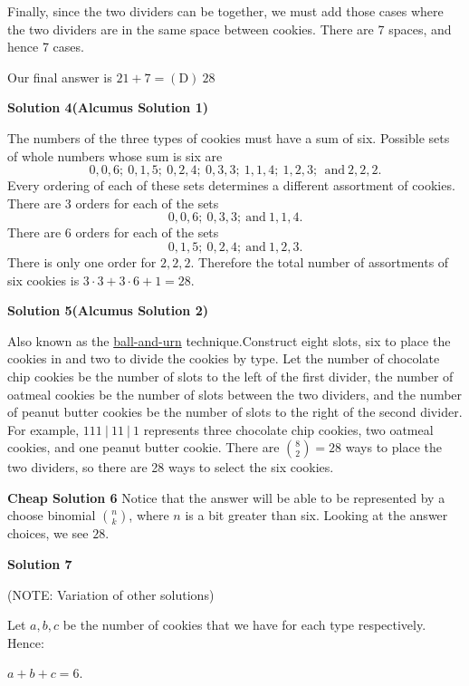 \begin{enumerate}
 Finally, since the two dividers can be together, we must add those cases where the two dividers are in the same space between cookies. There are 7 spaces, and hence 7 cases.

 Our final answer is $21+7=\boxed{\mathrm{(D)}\ 28}$




\textbf{Solution 4(Alcumus Solution 1)}

The numbers of the three types of cookies must have a sum of six. Possible sets of whole numbers whose sum is six are 
 \[0,0,6;\ 0,1,5;\ 0,2,4;\ 0,3,3;\ 1,1,4;\ 1,2,3;\ \ \text{and}\ 2,2,2.\] Every ordering of each of these sets determines a different assortment of cookies. There are 3 orders for each of the sets 
 \[0,0,6;\ 0,3,3;\ \text{and}\ 1,1,4.\] There are 6 orders for each of the sets 
 \[0,1,5;\ 0,2,4;\ \text{and}\ 1,2,3.\] There is only one order for $2,2,2$. Therefore the total number of assortments of six cookies is $3\cdot 3 + 3\cdot 6 + 1 = 28$.

 



\textbf{Solution 5(Alcumus Solution 2)}

Also known as the \href{https://artofproblemsolving.com/wiki/index.php?title=Ball-and-urn}{ball-and-urn} technique.Construct eight slots, six to place the cookies in and two to divide the cookies by type. Let the number of chocolate chip cookies be the number of slots to the left of the first divider, the number of oatmeal cookies be the number of slots between the two dividers, and the number of peanut butter cookies be the number of slots to the right of the second divider. For example, $111\ | \ 11\ | \ 1$ represents three chocolate chip cookies, two oatmeal cookies, and one peanut butter cookie. There are $\binom{8}{2} = \boxed{28}$ ways to place the two dividers, so there are 28 ways to select the six cookies.

 \textbf{Cheap Solution 6} Notice that the answer will be able to be represented by a choose binomial $\binom{n}{k}$, where $n$ is a bit greater than six. Looking at the answer choices, we see $\boxed{28}$.

 



\textbf{Solution 7}

(NOTE: Variation of other solutions)

 Let $a, b,c$ be the number of cookies that we have for each type respectively. Hence:

 $a + b + c = 6.$


\end{enumerate}

